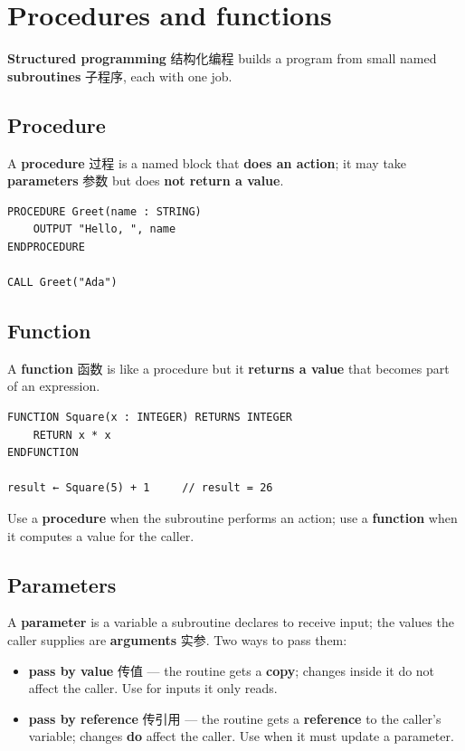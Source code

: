 \documentclass[11pt]{article}
\begin{document}
\section*{Procedures and functions}

\textbf{Structured programming} 结构化编程 builds a program from small named \textbf{subroutines} 子程序, each with one job.

\subsection*{Procedure}

A \textbf{procedure} 过程 is a named block that \textbf{does an action}; it may take \textbf{parameters} 参数 but does \textbf{not return a value}.

\begin{Verbatim}
PROCEDURE Greet(name : STRING)
    OUTPUT "Hello, ", name
ENDPROCEDURE

CALL Greet("Ada")
\end{Verbatim}

\subsection*{Function}

A \textbf{function} 函数 is like a procedure but it \textbf{returns a value} that becomes part of an expression.

\begin{Verbatim}
FUNCTION Square(x : INTEGER) RETURNS INTEGER
    RETURN x * x
ENDFUNCTION

result ← Square(5) + 1     // result = 26
\end{Verbatim}

Use a \textbf{procedure} when the subroutine performs an action; use a \textbf{function} when it computes a value for the caller.

\subsection*{Parameters}

A \textbf{parameter} is a variable a subroutine declares to receive input; the values the caller supplies are \textbf{arguments} 实参. Two ways to pass them:

\begin{itemize}
\item \textbf{pass by value} 传值 — the routine gets a \textbf{copy}; changes inside it do not affect the caller. Use for inputs it only reads.

\item \textbf{pass by reference} 传引用 — the routine gets a \textbf{reference} to the caller's variable; changes \textbf{do} affect the caller. Use when it must update a parameter.

\end{itemize}
\end{document}
